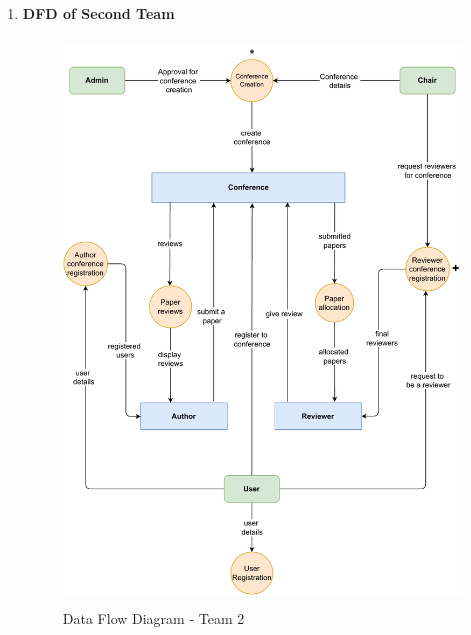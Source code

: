 \documentclass[english,a4paper,12pt]{report}
\begin{document}
\begin{enumerate}
\item \textbf{DFD of Second Team}
\begin{figure}[h!]
 \centering
 \includegraphics[keepaspectratio,height=15cm]{SRA-Images/DFD-team2.pdf}
 \caption{Data Flow Diagram - Team 2}
\end{figure}


\end{enumerate}
\end{document}
